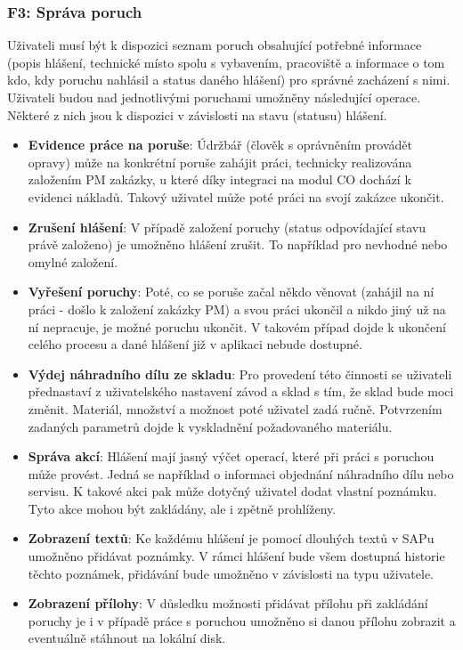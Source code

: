 \documentclass[thesis=M,czech]{FITthesis}[2012/06/26]
\begin{document}
\subsubsection{F3: Správa poruch}
Uživateli musí být k dispozici seznam poruch obsahující potřebné informace (popis hlášení, technické místo spolu s vybavením, pracoviště a informace o tom kdo, kdy poruchu nahlásil a status daného hlášení) pro správné zacházení s nimi. Uživateli budou nad jednotlivými poruchami umožněny následující operace. Některé z nich jsou k dispozici v závislosti na stavu (statusu) hlášení.
\begin{itemize}
	\item
	\textbf{Evidence práce na poruše}: Údržbář (člověk s oprávněním provádět opravy) může na konkrétní poruše zahájit práci, technicky realizována založením PM zakázky, u které díky integraci na modul CO dochází k evidenci nákladů. Takový uživatel může poté práci na svojí zakázce ukončit.
	\item
	\textbf{Zrušení hlášení}: V případě založení poruchy (status odpovídající stavu právě založeno) je umožněno hlášení zrušit. To například pro nevhodné nebo omylné založení. 
	\item
	\textbf{Vyřešení poruchy}: Poté, co se poruše začal někdo věnovat (zahájil na ní práci - došlo k založení zakázky PM) a svou práci ukončil a nikdo jiný už na ní nepracuje, je možné poruchu ukončit. V takovém případ dojde k ukončení celého procesu a dané hlášení již v aplikaci nebude dostupné.
	\item
	\textbf{Výdej náhradního dílu ze skladu}: Pro provedení této činnosti se uživateli přednastaví z uživatelského nastavení závod a sklad s tím, že sklad bude moci změnit. Materiál, množství a možnost poté uživatel zadá ručně. Potvrzením zadaných parametrů dojde k vyskladnění požadovaného materiálu.
	\item
	\textbf{Správa akcí}: Hlášení mají jasný výčet operací, které při práci s poruchou může provést. Jedná se například o informaci objednání náhradního dílu nebo servisu. K takové akci pak může dotyčný uživatel dodat vlastní poznámku. Tyto akce mohou být zakládány, ale i zpětně prohlíženy.
	\item
	\textbf{Zobrazení textů}: Ke každému hlášení je pomocí dlouhých textů v SAPu umožněno přidávat poznámky. V rámci hlášení bude všem dostupná historie těchto poznámek, přidávání bude umožněno v závislosti na typu uživatele.
	\item
	\textbf{Zobrazení přílohy}: V důsledku možnosti přidávat přílohu při zakládání poruchy je i v případě práce s poruchou umožněno si danou přílohu zobrazit a eventuálně stáhnout na lokální disk.
\end{itemize} 
\end{document}
